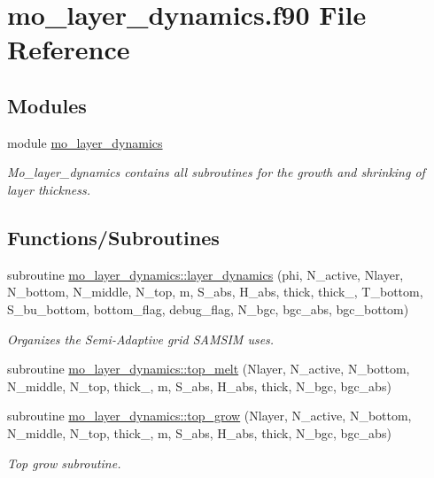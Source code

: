 \hypertarget{mo__layer__dynamics_8f90}{
\section{mo\_\-layer\_\-dynamics.f90 File Reference}
\label{mo__layer__dynamics_8f90}
}
\subsection*{Modules}
\begin{DoxyCompactItemize}
\item 
module \hyperlink{namespacemo__layer__dynamics}{mo\_\-layer\_\-dynamics}


\begin{DoxyCompactList}\small\item\em Mo\_\-layer\_\-dynamics contains all subroutines for the growth and shrinking of layer thickness. \item\end{DoxyCompactList}

\end{DoxyCompactItemize}
\subsection*{Functions/Subroutines}
\begin{DoxyCompactItemize}
\item 
subroutine \hyperlink{namespacemo__layer__dynamics_a4b67e1200af1131f76796868c2552a57}{mo\_\-layer\_\-dynamics::layer\_\-dynamics} (phi, N\_\-active, Nlayer, N\_\-bottom, N\_\-middle, N\_\-top, m, S\_\-abs, H\_\-abs, thick, thick\_, T\_\-bottom, S\_\-bu\_\-bottom, bottom\_\-flag, debug\_\-flag, N\_\-bgc, bgc\_\-abs, bgc\_\-bottom)
\begin{DoxyCompactList}\small\item\em Organizes the Semi-\/Adaptive grid SAMSIM uses. \item\end{DoxyCompactList}\item 
subroutine \hyperlink{namespacemo__layer__dynamics_aadc5de505c96dad5c7fe5bdb233102a6}{mo\_\-layer\_\-dynamics::top\_\-melt} (Nlayer, N\_\-active, N\_\-bottom, N\_\-middle, N\_\-top, thick\_, m, S\_\-abs, H\_\-abs, thick, N\_\-bgc, bgc\_\-abs)
\item 
subroutine \hyperlink{namespacemo__layer__dynamics_ad2f5a196bac29bfdc04d442b0b722a24}{mo\_\-layer\_\-dynamics::top\_\-grow} (Nlayer, N\_\-active, N\_\-bottom, N\_\-middle, N\_\-top, thick\_, m, S\_\-abs, H\_\-abs, thick, N\_\-bgc, bgc\_\-abs)
\begin{DoxyCompactList}\small\item\em Top grow subroutine. \item\end{DoxyCompactList}\end{DoxyCompactItemize}
